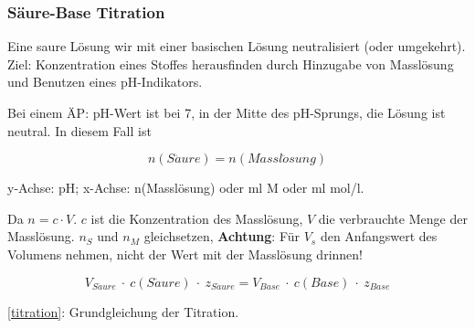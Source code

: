 \subsubsection{Säure-Base Titration}

Eine saure Lösung wir mit einer basischen Lösung neutralisiert (oder umgekehrt). Ziel: Konzentration eines Stoffes herausfinden durch Hinzugabe von Masslösung und Benutzen eines pH-Indikators.

\begin{definition}[Äquivalenzpunkt]
	Bei einem ÄP: pH-Wert ist bei 7, in der Mitte des pH-Sprungs, die Lösung ist neutral. In diesem Fall ist
	
	{\large
		\begin{equation}
			n(S\ddot{a}ure) = n(Massl\ddot{o}sung)
		\end{equation}	
	}
	
	y-Achse: pH; x-Achse: n(Masslösung) oder ml M oder ml mol/l.
\end{definition}

Da $n=c \cdot V$. $c$ ist die Konzentration des Masslösung, $V$ die verbrauchte Menge der Masslösung. $n_S$ und $n_M$ gleichsetzen, \textbf{Achtung}: Für $V_s$ den Anfangswert des Volumens nehmen, nicht der Wert mit der Masslösung drinnen!

{\large
	\begin{equation}
	\label{titration}
	V_{S\ddot{a}ure}\ \cdot \ c(S\ddot{a}ure) \ \cdot \ z_{S\ddot{a}ure} = V_{Base} \ \cdot \ c(Base) \ \cdot \ z_{Base}
	\end{equation}	
}

\ref{titration}: Grundgleichung der Titration.
